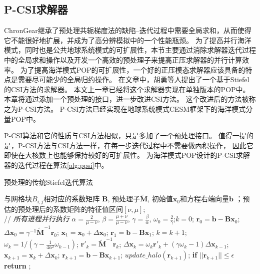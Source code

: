 \subsection{P-CSI求解器}
\label{precond:pcsi}
ChronGear继承了预处理共轭梯度法的缺陷--迭代过程中需要全局求和，从而使得它不能很好地扩展，并成为了高分辨模拟中的一个性能瓶颈。
为了提高并行海洋模式，同时也是公共地球系统模式的可扩展性，本节主要通过消除求解器迭代过程中的全局求和操作以及开发一个高效的预处理子来提高正压求解器的并行计算效率。
为了提高海洋模式POP的可扩展性，一个好的正压模态求解器应该具备的特点是需要尽可能少的全局归约操作。 
在文章\cite{hu2013scalable}中，胡勇等人提出了一个基于Stiefel的CSI方法的求解器。
本文上一章已经将这个求解器实现在单独版本的POP中。 
本章将通过添加一个预处理的接口，进一步改进CSI方法。
这个改进后的方法被称之为P-CSI方法。 P-CSI方法已经实现在地球系统模式CESM框架下的海洋模式分量POP中。 

P-CSI算法和它的性质与CSI方法相似，只是多加了一个预处理接口。 
值得一提的是，P-CSI方法与CSI方法一样，在每一步迭代过程中不需要做內积操作， 因此它即使在大核数上也能够保持较好的可扩展性。
为海洋模式POP设计的P-CSI求解器的迭代过程在算法\ref{alg:ppsi}中。

\begin{algorithm}[!t]
\caption{ 预处理的传统Stiefel迭代算法}
\label{alg:ppsi}
\begin{algorithmic}[1]
\REQUIRE 与网格块$B_{i,j}$相对应的系数矩阵 $\textbf{B}$, 预处理子$\tilde{\textbf{M}}$, 初始值$\textbf{x}_0$和方程右端向量$\textbf{b}$ ；预估的预处理后的系数矩阵的特征值区间$[\nu,\mu]$;  \\
 // \qquad    \textit{所有进程并行执行}
\STATE $\alpha =\frac{2}{\mu -\nu}$, $ \beta = \frac{\mu +\nu}{\mu -\nu}$, $\gamma = \frac{\beta}{\alpha}$, $\omega_0 =\frac{ 2}{\gamma}$;\quad $k = 0$;
\STATE $\textbf{r}_0 = \textbf{b}-\textbf{B}\textbf{x}_0$; $\Delta \textbf{x}_{0} = \gamma^{-1}\tilde{\textbf{M}}^{-1}\textbf{r}_0$; $\textbf{x}_1 =\textbf{x}_0 +\Delta \textbf{x}_{0}$; $\textbf{r}_1 =\textbf{b} -\textbf{B}\textbf{x}_1$;
\STATE $k=k+1$;
\STATE $\omega_k = 1/(\gamma - \frac{1}{4\alpha^2}\omega_{k-1})$; 
\STATE $\textbf{r}'_{k} =\tilde{\textbf{M}}^{-1}\textbf{r}_{k}$; \label{alg:ppsi_pre}  
\STATE $\Delta \textbf{x}_{k} =\omega_k\textbf{r}'_{k}+(\gamma \omega_k-1)\Delta \textbf{x}_{k-1}$;
\STATE $\textbf{x}_{k+1} =\textbf{x}_{k}+\Delta \textbf{x}_{k}$;
\STATE $\textbf{r}_{k+1} =\textbf{b}- \textbf{B}\textbf{x}_{k+1}$; 
\STATE $update\_halo(\textbf{r}_{k+1})$; 
\STATE \textbf{if} $||\textbf{r}_{k+1}|| \le \epsilon$  \textbf{return} ;
\ENDIF
\ENDWHILE
\end{algorithmic}
\end{algorithm}


